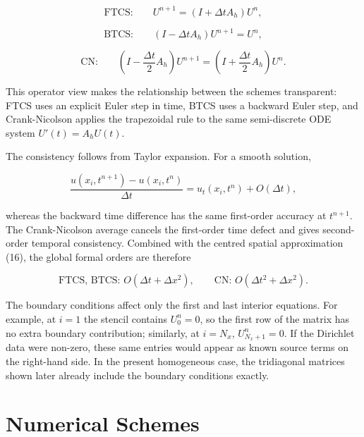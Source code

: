 \documentclass[11pt,a4paper]{article}
\begin{document}
\begin{equation}
\text{FTCS:}\qquad U^{n+1} = \left(I+\Delta t A_h\right)U^n, \tag{19}
\end{equation}

\begin{equation}
\text{BTCS:}\qquad \left(I-\Delta t A_h\right)U^{n+1}=U^n, \tag{20}
\end{equation}

\begin{equation}
\text{CN:}\qquad \left(I-\frac{\Delta t}{2}A_h\right)U^{n+1}
=\left(I+\frac{\Delta t}{2}A_h\right)U^n. \tag{21}
\end{equation}

This operator view makes the relationship between the schemes transparent: FTCS uses an explicit Euler step in time, BTCS uses a backward Euler step, and Crank-Nicolson applies the trapezoidal rule to the same semi-discrete ODE system $U'(t)=A_hU(t)$.

The consistency follows from Taylor expansion. For a smooth solution,

\begin{equation}
\frac{u(x_i,t^{n+1})-u(x_i,t^n)}{\Delta t}
=u_t(x_i,t^n)+O(\Delta t), \tag{22}
\end{equation}

whereas the backward time difference has the same first-order accuracy at $t^{n+1}$. The Crank-Nicolson average cancels the first-order time defect and gives second-order temporal consistency. Combined with the centred spatial approximation (16), the global formal orders are therefore

\begin{equation}
\text{FTCS, BTCS: } O(\Delta t+\Delta x^2), \qquad
\text{CN: } O(\Delta t^2+\Delta x^2). \tag{23}
\end{equation}

The boundary conditions affect only the first and last interior equations. For example, at $i=1$ the stencil contains $U_0^n=0$, so the first row of the matrix has no extra boundary contribution; similarly, at $i=N_x$, $U_{N_x+1}^n=0$. If the Dirichlet data were non-zero, these same entries would appear as known source terms on the right-hand side. In the present homogeneous case, the tridiagonal matrices shown later already include the boundary conditions exactly.

\section{Numerical Schemes}
\end{document}
